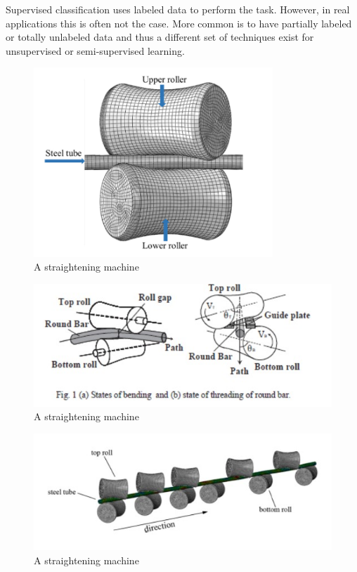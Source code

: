 \documentclass{article}
\begin{document}
Supervised classification uses labeled data to perform the task. However, in real applications this is often not the case. More common is to have partially labeled or totally unlabeled data and thus a different set of techniques exist for unsupervised or semi-supervised learning.

\begin{figure}[H]
	\centering
	\includegraphics[width=90mm, keepaspectratio]{straightening2.png}
	\caption{A straightening machine~\cite{ma2020effect}}
	\label{straighteningImage2}
\end{figure}

\begin{figure}[H]
	\centering
	\includegraphics[]{straightening1.jpg}
	\caption{A straightening machine~\cite{kato2014straightening}}
	\label{straighteningImage1}
\end{figure}

\begin{figure}[H]
	\centering
	\includegraphics[]{straightening3.jpg}
	\caption{A straightening machine~\cite{ma2021analysis}}
	\label{straighteningImage3}
\end{figure}
\end{document}
